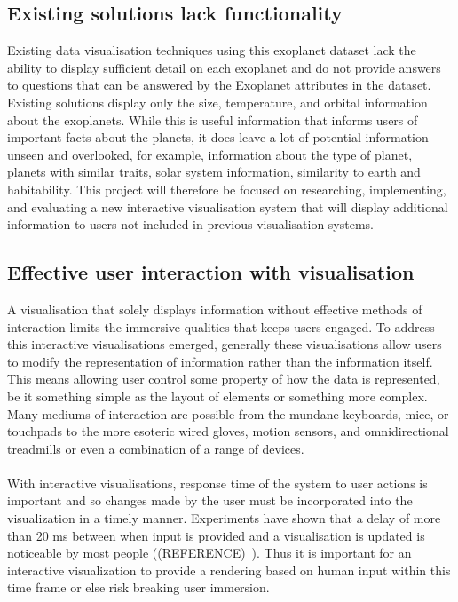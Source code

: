 \subsection{Existing solutions lack functionality}
Existing data visualisation techniques using this exoplanet dataset lack the ability to display sufficient detail on each exoplanet and do not provide answers to questions that can be answered by the Exoplanet attributes in the dataset. Existing solutions display only the size, temperature, and orbital information about the exoplanets. While this is useful information that informs users of important facts about the planets, it does leave a lot of potential information unseen and overlooked, for example, information about the type of planet, planets with similar traits, solar system information, similarity to earth and habitability. This project will therefore be focused on researching, implementing, and evaluating a new interactive visualisation system that will display additional information to users not included in previous visualisation systems.

\subsection{Effective user interaction with visualisation}
A visualisation that solely displays information without effective methods of interaction limits the immersive qualities that keeps users engaged. To address this interactive visualisations emerged, generally these visualisations allow users to modify the representation of information rather than the information itself. This means allowing user control some property of how the data is represented, be it something simple as the layout of elements or something more complex. Many mediums of interaction are possible from the mundane keyboards, mice, or touchpads to the more esoteric wired gloves, motion sensors, and omnidirectional treadmills or even a combination of a range of devices.
\\\\
With interactive visualisations, response time of the system to user actions is important and so changes made by the user must be incorporated into the visualization in a timely manner. Experiments have shown that a delay of more than 20 ms between when input is provided and a visualisation is updated is noticeable by most people ((REFERENCE)~). Thus it is important for an interactive visualization to provide a rendering based on human input within this time frame or else risk breaking user immersion.
\\\\

